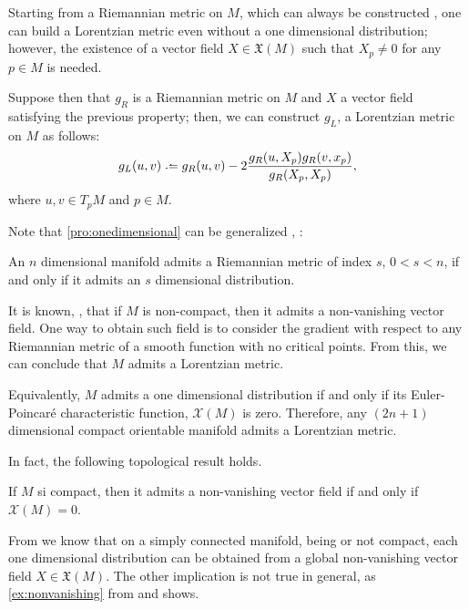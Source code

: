 Starting from a Riemannian metric on $M$, which can always be constructed \cite{romero10}, one can build a Lorentzian metric even without a one dimensional distribution; however, the existence of a vector field $X \in \mathfrak{X}(M)$ such that $X_p \neq 0$ for any $p \in M$ is needed.

Suppose then that $g_R$ is a Riemannian metric on $M$ and $X$ a vector field satisfying the previous property; then, we can construct $g_L$, a Lorentzian metric on $M$ as follows:
\[
g_L(u,v) \defeq g_R(u,v) - 2  \frac{g_R(u, X_p)g_R(v,x_p)}{g_R(X_p,X_p)},
\]
where $u,v \in T_pM$ and $p \in M$.

Note that \autoref{pro:onedimensional} can be generalized \cite[Prop. 4.3]{romero10}, \cite{greub72}:

\begin{proposition}
	An $n$ dimensional manifold admits a Riemannian metric of index $s$, $0 < s < n$, if and only if it admits an $s$ dimensional distribution.
\end{proposition}

It is known, \cite[p. 205]{romero10}, that if $M$ is non-compact, then it admits a non-vanishing vector field. One way to obtain such field is to consider the gradient with respect to any Riemannian metric of a smooth function with no critical points. From this, we can conclude that $M$ admits a Lorentzian metric.

Equivalently, $M$ admits a one dimensional distribution if and only if its Euler-Poincaré characteristic function, $\mathcal{X}(M)$ is zero. Therefore, any $(2n + 1)$ dimensional compact orientable manifold admits a Lorentzian metric.

In fact, the following topological result holds.
\begin{proposition}
	If $M$ si compact, then it admits a non-vanishing vector field if and only if $\mathcal{X}(M)=0$.
\end{proposition}

From \cite{romero10} we know that on a simply connected manifold, being or not compact, each one dimensional distribution can be obtained from a global non-vanishing vector field $X \in \mathfrak{X}(M)$. The other implication is not true in general, as \autoref{ex:nonvanishing} from \cite[pp. 205-206]{romero10} and \cite{greub72} shows.

